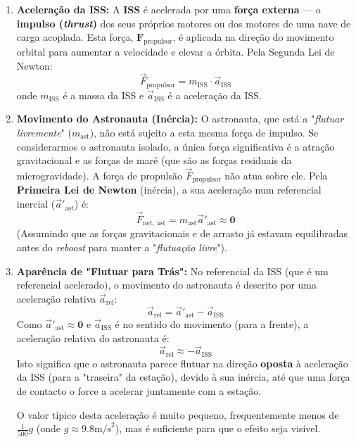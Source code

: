 \documentclass[a4paper,12pt]{article}
\begin{document}
	\begin{enumerate}
		\item \textbf{Aceleração da ISS:} A \textbf{ISS} é acelerada por uma \textbf{força externa} --- o \textbf{impulso (\textit{thrust})} dos seus próprios motores ou dos motores de uma nave de carga acoplada. Esta força, $\mathbf{F}_{\text{propulsor}}$, é aplicada na direção do movimento orbital para aumentar a velocidade e elevar a órbita. Pela Segunda Lei de Newton:
		$$\vec{F}_{\text{propulsor}} = m_{\text{ISS}} \cdot \vec{a}_{\text{ISS}}$$
		onde $m_{\text{ISS}}$ é a massa da ISS e $\vec{a}_{\text{ISS}}$ é a aceleração da ISS.
		
		\item \textbf{Movimento do Astronauta (Inércia):} O astronauta, que está a "\textit{flutuar livremente}" ($m_{\text{ast}}$), não está sujeito a esta mesma força de impulso. Se considerarmos o astronauta isolado, a única força significativa é a atração gravitacional e as forças de maré (que são as forças residuais da microgravidade). A força de propulsão $\vec{F}_{\text{propulsor}}$ não atua sobre ele. Pela \textbf{Primeira Lei de Newton} (inércia), a sua aceleração num referencial inercial ($\vec{a}'_{\text{ast}}$) é:
		$$\vec{F}_{\text{net, ast}} = m_{\text{ast}} \vec{a}'_{\text{ast}} \approx \mathbf{0}$$
		(Assumindo que as forças gravitacionais e de arrasto já estavam equilibradas antes do \textit{reboost} para manter a "\textit{flutuação livre}").
		
		\item \textbf{Aparência de "Flutuar para Trás":} No referencial da ISS (que é um referencial acelerado), o movimento do astronauta é descrito por uma aceleração relativa $\vec{a}_{\text{rel}}$:
		$$\vec{a}_{\text{rel}} = \vec{a}'_{\text{ast}} - \vec{a}_{\text{ISS}}$$
		Como $\vec{a}'_{\text{ast}} \approx \mathbf{0}$ e $\vec{a}_{\text{ISS}}$ é no sentido do movimento (para a frente), a aceleração relativa do astronauta é:
		$$\vec{a}_{\text{rel}} \approx - \vec{a}_{\text{ISS}}$$
		Isto significa que o astronauta parece flutuar na direção \textbf{oposta} à aceleração da ISS (para a "traseira" da estação), devido à sua inércia, até que uma força de contacto o force a acelerar juntamente com a estação.
		
		O valor típico desta aceleração é muito pequeno, frequentemente menos de $\frac{1}{500}g$ (onde $g \approx 9.8 \text{m/s}^2$), mas é suficiente para que o efeito seja visível.
	\end{enumerate}
\end{document}
